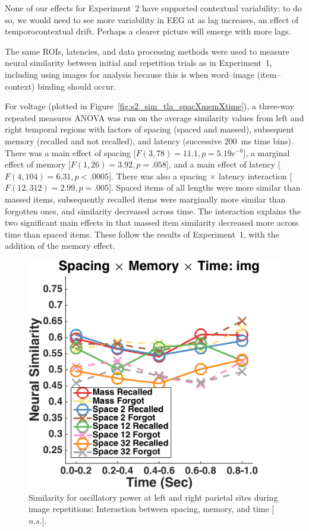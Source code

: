 
None of our effects for Experiment~2 have supported contextual variability; to do so, we would need to see more variability in EEG at as lag increases, an effect of temporocontextual drift.
Perhaps a clearer picture will emerge with more lags.


The same ROIs, latencies, and data processing methods were used to measure neural similarity between initial and repetition trials as in Experiment~1, including using images for analysis because this is when word--image (item--context) binding should occur.
 

For voltage (plotted in Figure~\ref{fig:s2_sim_tla_spacXmemXtime}), a three-way repeated measures ANOVA was run on the average similarity values from left and right temporal regions with factors of spacing (spaced and massed), subsequent memory (recalled and not recalled), and latency (successive 200~ms time bins).  There was a main effect of spacing [$F(3,78)=11.1, p=5.19e^{-6}$], a marginal effect of memory [$F(1,26)=3.92, p=.058$], and a main effect of latency [$F(4,104)=6.31, p<.0005$].  There was also a spacing $\times$ latency interaction [$F(12,312)=2.99, p=.005$].  Spaced items of all lengths were more similar than massed items, subsequently recalled items were marginally more similar than forgotten ones, and similarity decreased across time.  The interaction explains the two significant main effects in that massed item similarity decreased more across time than spaced items.  These follow the results of Experiment~1, with the addition of the memory effect.

\begin{figure}[H]
  \centering
  \includegraphics[width=.40\textwidth]{./figs/exp2/similarity_spacXmemXtime_img_pow_LPSRPS_0to200_200to400_400to600_600to800_800to1000_kaiser_cosine}
  \caption{Similarity for oscillatory power at left and right parietal sites during image repetitions: Interaction between spacing, memory, and time [$n.s.$].}
  \label{fig:s2_sim_pow_spacXmemXtime}
\end{figure}

